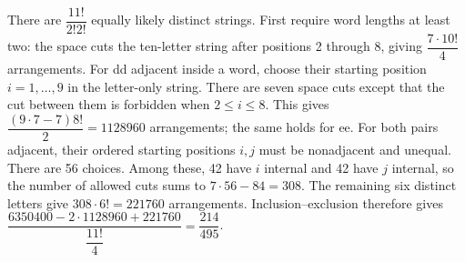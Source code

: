 There are $\dfrac{11!}{2!2!}$ equally likely distinct strings. First require word lengths at least two: the space cuts the ten-letter string after positions 2 through 8, giving $\dfrac{7\cdot10!}{4}$ arrangements. For dd adjacent inside a word, choose their starting position $i=1,\ldots,9$ in the letter-only string. There are seven space cuts except that the cut between them is forbidden when $2\le i\le8$. This gives $\dfrac{(9\cdot7-7)8!}{2}=1128960$ arrangements; the same holds for ee. For both pairs adjacent, their ordered starting positions $i,j$ must be nonadjacent and unequal. There are 56 choices. Among these, 42 have $i$ internal and 42 have $j$ internal, so the number of allowed cuts sums to $7\cdot56-84=308$. The remaining six distinct letters give $308\cdot6!=221760$ arrangements. Inclusion--exclusion therefore gives $\dfrac{6350400-2\cdot1128960+221760}{\dfrac{11!}{4}}=\boxed{\dfrac{214}{495}}$.
